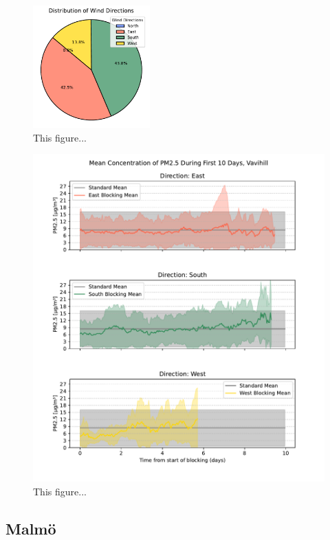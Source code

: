 \begin{figure}[H]
    \centering    \includegraphics[width=0.4\textwidth]{Figures/PieChart_Vavihill.pdf}
    \caption{This figure...}
    \label{fig:PieChart_Vavihill}
\end{figure}

\begin{figure}[H]
    \centering    \includegraphics[width=1\textwidth]{Figures/Meanplot_dir_Vavihill.pdf}
    \caption{This figure...}
    \label{fig:Meanplot_dir_Vavihill}
\end{figure}


\subsection{Malmö}

